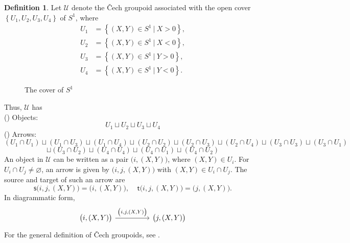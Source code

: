 \documentclass{article}
\theoremstyle{plain}
\theoremstyle{definition}
\newtheorem{defn}[thm]{Definition}
\newcommand{\rNum}[1]{\lowercase\expandafter{\romannumeral #1\relax}}
\begin{document}
\begin{defn}\label{coverofs1}
Let $\mathcal{U}$ denote the \v{C}ech groupoid associated with the open cover 
$\left\{U_1,U_2,U_3,U_4\right\}$ of $S^1$, where
\begin{align*}
U_1 & = \left\{(X,Y) \in S^1 ~ \big\vert ~ X > 0\right\}, \\
U_2 & = \left\{(X,Y) \in S^1 ~ \big\vert ~ X < 0\right\}, \\
U_3 & = \left\{(X,Y) \in S^1 ~ \big\vert ~ Y > 0\right\}, \\
U_4 & = \left\{(X,Y) \in S^1 ~ \big\vert ~ Y < 0\right\}.
\end{align*}
\begin{figure}[H]
\centering
{}
\caption{The cover of $S^1$}
\end{figure}
\noindent
Thus, $\mathcal{U}$ has \\
(\rNum{1}) Objects: $$U_1 \sqcup U_2 \sqcup U_3 \sqcup U_4$$
(\rNum{2}) Arrows:
$$(U_1 \cap U_1) \sqcup (U_1 \cap U_3) \sqcup (U_1 \cap U_4) \sqcup (U_2 \cap U_2) \sqcup (U_2 \cap U_3) \sqcup (U_2 \cap U_4) \sqcup (U_3 \cap U_3) \sqcup (U_3 \cap U_1)$$ 
$$\sqcup (U_3 \cap U_2) \sqcup (U_4 \cap U_4) \sqcup (U_4 \cap U_1) \sqcup (U_4 \cap U_2)$$
An object in $\mathcal{U}$ can be written as a pair $\bigl(i,(X,Y)\bigr)$, where $(X,Y) \in U_i$. For $U_i \cap U_j \neq \varnothing$, an arrow is given by $\bigl(i,j,(X,Y)\bigr)$ with $(X,Y) \in U_i \cap U_j$. The source and target of such an arrow are
$$\mathsf{s}\bigl(i,j,(X,Y)\bigr) = \bigl(i,(X,Y)\bigr), ~~~~~ \mathsf{t}\bigl(i,j,(X,Y)\bigr) = \bigl(j,(X,Y)\bigr).$$
In diagrammatic form,
\[
\begin{tikzcd}
\bigl(i,(X,Y)\bigr) \arrow[rr,"{\bigl(i,j,(X,Y)\bigr)}"] & & \bigl(j,(X,Y)\bigr)
\end{tikzcd}
\]
For the general definition of \v{C}ech groupoids, see \cite[Section 3 on page 370]{MR3089401}.
\end{defn}
\end{document}
